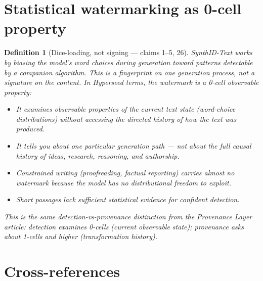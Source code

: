 \documentclass[11pt,a4paper]{article}
\newtheorem{definition}{Definition}[section]
\begin{document}
\section{Statistical watermarking as 0-cell property}
\label{sec:watermark}

\begin{definition}[Dice-loading, not signing --- claims 1--5, 26]
\label{def:watermark}
SynthID-Text works by biasing the model's word choices during generation
toward patterns detectable by a companion algorithm. This is a
\emph{fingerprint on one generation process}, not a signature on the
content. In Hyperseed terms, the watermark is a 0-cell observable
property:
\begin{itemize}
\item It examines observable properties of the current text state
  (word-choice distributions) without accessing the directed history
  of how the text was produced.
\item It tells you about one particular generation path --- not about
  the full causal history of ideas, research, reasoning, and authorship.
\item Constrained writing (proofreading, factual reporting) carries
  almost no watermark because the model has no distributional freedom
  to exploit.
\item Short passages lack sufficient statistical evidence for confident
  detection.
\end{itemize}
This is the same detection-vs-provenance distinction from the Provenance
Layer article: detection examines 0-cells (current observable state);
provenance asks about 1-cells and higher (transformation history).
\end{definition}


\section{Cross-references}
\end{document}
